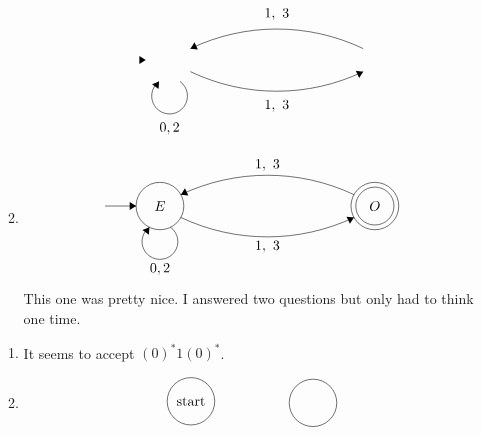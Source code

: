 \documentclass[12pt]{article}
\theoremstyle{definition}
\theoremstyle{remark}
\newcommand\setItemnumber[1]{\setcounter{enumi}{\numexpr#1-1\relax}}
\begin{document}
\begin{enumerate}[leftmargin=\labelsep]
\begin{enumerate}
\begin{align*}
\begin{tikzpicture}[scale=0.2]
					\fill [black] (10.4,-29) -- (9.6,-28.5) -- (9.6,-29.5);
					\draw [black] (14.723,-31.68) arc (54:-234:2.25);
					\draw (13.4,-36.25) node [below] {$0,2$};
					\fill [black] (12.08,-31.68) -- (11.2,-32.03) -- (12.01,-32.62);
					\draw [black] (37.774,-30.447) arc (-64.54137:-115.45863:25.297);
					\fill [black] (37.77,-30.45) -- (36.84,-30.34) -- (37.27,-31.24);
					\draw (26.9,-33.4) node [below] {$1,\mbox{ }3$};
					\draw [black] (16.027,-27.555) arc (115.41534:64.58466:25.334);
					\fill [black] (16.03,-27.56) -- (16.96,-27.66) -- (16.54,-26.76);
					\draw (26.9,-24.6) node [above] {$1,\mbox{ }3$};
				\end{tikzpicture}
			\end{align*}
			\item 
			\begin{align*}
				\begin{tikzpicture}[scale=0.2]
					\tikzstyle{every node}+=[inner sep=0pt]
					\draw [black] (13.4,-29) circle (3);
					\draw (13.4,-29) node {$E$};
					\draw [black] (40.4,-29) circle (3);
					\draw (40.4,-29) node {$O$};
					\draw [black] (40.4,-29) circle (2.4);
					\draw [black] (6.5,-29) -- (10.4,-29);
					\fill [black] (10.4,-29) -- (9.6,-28.5) -- (9.6,-29.5);
					\draw [black] (14.723,-31.68) arc (54:-234:2.25);
					\draw (13.4,-36.25) node [below] {$0,2$};
					\fill [black] (12.08,-31.68) -- (11.2,-32.03) -- (12.01,-32.62);
					\draw [black] (37.774,-30.447) arc (-64.54137:-115.45863:25.297);
					\fill [black] (37.77,-30.45) -- (36.84,-30.34) -- (37.27,-31.24);
					\draw (26.9,-33.4) node [below] {$1,\mbox{ }3$};
					\draw [black] (16.027,-27.555) arc (115.41534:64.58466:25.334);
					\fill [black] (16.03,-27.56) -- (16.96,-27.66) -- (16.54,-26.76);
					\draw (26.9,-24.6) node [above] {$1,\mbox{ }3$};
				\end{tikzpicture}
			\end{align*}
			This one was pretty nice. I answered two questions but only had to think one time.
		\end{enumerate}
		\setItemnumber{5}
		\begin{enumerate}
			\item It seems to accept $(0)^*1(0)^*$.
			\item \begin{align*}
				\begin{tikzpicture}[scale=0.2]
					\tikzstyle{every node}+=[inner sep=0pt]
					\draw [black] (14.9,-24.3) circle (3);
					\draw (14.9,-24.3) node {start};
					\draw [black] (30.3,-24.5) circle (3);

\end{tikzpicture}
\end{align*}
\end{enumerate}
\end{enumerate}
\end{document}
